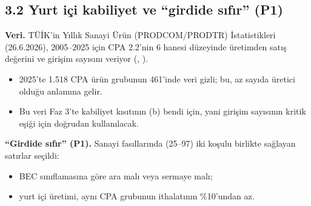 \hypertarget{02a_politika_uzayi-32-yurt-iuxe7i-kabiliyet-ve-girdide-sux131fux131r-p1}{%
\subsection{3.2 Yurt içi kabiliyet ve ``girdide sıfır'' (P1)}\label{02a_politika_uzayi-32-yurt-iuxe7i-kabiliyet-ve-girdide-sux131fux131r-p1}}

\textbf{Veri.} TÜİK'in Yıllık Sanayi Ürün (PRODCOM/PRODTR) İstatistikleri (26.6.2026), 2005--2025 için CPA 2.2'nin 6 hanesi düzeyinde üretimden satış değerini ve girişim sayısını veriyor (, ).

\begin{itemize}
\tightlist
\item
  2025'te 1.518 CPA ürün grubunun 461'inde veri gizli; bu, az sayıda üretici olduğu anlamına gelir.
\item
  Bu veri Faz 3'te kabiliyet kısıtının (b) bendi için, yani girişim sayısının kritik eşiği için doğrudan kullanılacak.
\end{itemize}

\textbf{``Girdide sıfır'' (P1).} Sanayi fasıllarında (25--97) iki koşulu birlikte sağlayan satırlar seçildi:

\begin{itemize}
\tightlist
\item
  BEC sınıflamasına göre ara malı veya sermaye malı;
\item
  yurt içi üretimi, aynı CPA grubunun ithalatının \%10'undan az.
\end{itemize}

\begingroup\gbtablo\footnotesize

